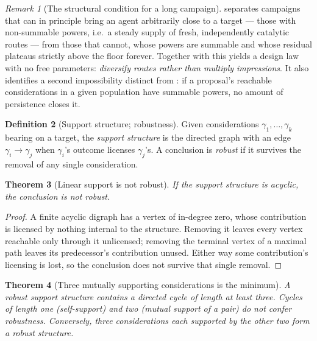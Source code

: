 \documentclass[11pt,a4paper]{article}
\theoremstyle{clstyle}
\newtheorem{theorem}{Theorem}[section]
\theoremstyle{definition}
\newtheorem{definition}[theorem]{Definition}
\theoremstyle{remark}
\newtheorem{remark}[theorem]{Remark}
\begin{document}
\begin{remark}[The structural condition for a long campaign]
\label{rem:campaign}
 separates campaigns that can in principle bring an
agent arbitrarily close to a target --- those with non-summable powers, i.e.\
a steady supply of fresh, independently catalytic routes --- from those that
cannot, whose powers are summable and whose residual plateaus strictly above
the floor forever. Together with \Cref{cor:saturate} this yields a design
law with no free parameters: \emph{diversify routes rather than multiply
impressions}. It also identifies a second impossibility distinct from
\Cref{rem:threshold}: if a proposal's reachable considerations in a given
population have summable powers, no amount of persistence closes it.
\end{remark}

\begin{definition}[Support structure; robustness]
\label{def:support}
Given considerations $\gamma_1,\dots,\gamma_k$ bearing on a target, the
\emph{support structure} is the directed graph with an edge
$\gamma_i\to\gamma_j$ when $\gamma_i$'s outcome licenses $\gamma_j$'s. A
conclusion is \emph{robust} if it survives the removal of any single
consideration.
\end{definition}

\begin{theorem}[Linear support is not robust]
\label{thm:linear}
If the support structure is acyclic, the conclusion is not robust.
\end{theorem}

\begin{proof}
A finite acyclic digraph has a vertex of in-degree zero, whose contribution
is licensed by nothing internal to the structure. Removing it leaves every
vertex reachable only through it unlicensed; removing the terminal vertex of
a maximal path leaves its predecessor's contribution unused. Either way some
contribution's licensing is lost, so the conclusion does not survive that
single removal.
\end{proof}

\begin{theorem}[Three mutually supporting considerations is the minimum]
\label{thm:three}
A robust support structure contains a directed cycle of length at least
three. Cycles of length one (self-support) and two (mutual support of a pair)
do not confer robustness. Conversely, three considerations each supported by
the other two form a robust structure.
\end{theorem}
\end{document}
